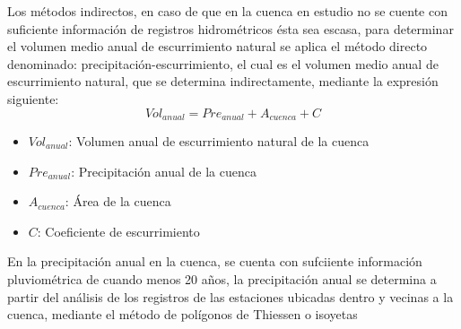 
Los métodos indirectos, en caso de que en la cuenca en estudio no se cuente con suficiente información de registros hidrométricos ésta sea escasa, para determinar el volumen medio anual de escurrimiento natural se aplica el método directo denominado: precipitación-escurrimiento, el cual es el volumen medio anual de escurrimiento natural, que se determina indirectamente, mediante la expresión siguiente:
\begin{equation}
    Vol_{anual} = Pre_{anual} + A_{cuenca} + C
\end{equation}
\begin{notation}
    \begin{itemize}
        \item $Vol_{anual}$: Volumen anual de escurrimiento natural de la cuenca
        \item $Pre_{anual}$: Precipitación anual de la cuenca
        \item $A_{cuenca}$: Área de la cuenca
        \item $C$: Coeficiente de escurrimiento
    \end{itemize}
\end{notation}
En la precipitación anual en la cuenca, se cuenta con sufciiente información pluviométrica de cuando menos 20 años, la precipitación anual se determina a partir del análisis de los registros de las estaciones ubicadas dentro y vecinas a la cuenca, mediante el método de polígonos de Thiessen o isoyetas



